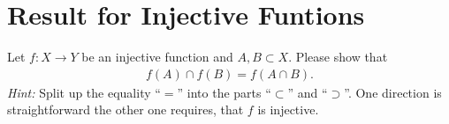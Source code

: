 \section{Result for Injective Funtions}
Let $f: X \rightarrow Y$ be an injective function and $A,B \subset X$. Please show that
\begin{align*}
f(A) \cap f(B) = f(A \cap B).
\end{align*}
\textit{Hint:} Split up the equality ``$=$'' into the parts ``$\subset$'' and  ``$\supset$''. One direction is straightforward the other one requires, that $f$ is injective.